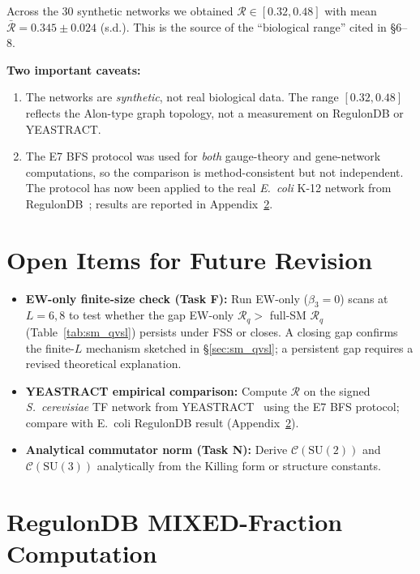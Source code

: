 \documentclass[12pt,a4paper]{article}
\newcommand{\R}{\mathcal{R}}           %
\newcommand{\SU}[1]{\mathrm{SU}(#1)}
\theoremstyle{plain}
\theoremstyle{definition}
\theoremstyle{remark}
\begin{document}
Across the 30 synthetic networks we obtained $\R\in[0.32,0.48]$ with mean
$\bar{\R}=0.345\pm0.024$ (s.d.).  This is the source of the ``biological range''
cited in §6--8.

\textbf{Two important caveats:}
\begin{enumerate}
  \item The networks are \emph{synthetic}, not real biological data.  The range
    $[0.32,0.48]$ reflects the Alon-type graph topology, not a measurement
    on RegulonDB or YEASTRACT.
  \item The E7 BFS protocol was used for \emph{both} gauge-theory and gene-network
    computations, so the comparison is method-consistent but not independent.
    The protocol has now been applied to the real \textit{E.~coli} K-12 network
    from RegulonDB~\citep{SantosZavaleta2019}; results are reported in Appendix~\ref{app:regulondb}.
\end{enumerate}

\section{Open Items for Future Revision}
\label{app:openitems}

\begin{itemize}
  \item \textbf{EW-only finite-size check (Task F):}
    Run EW-only ($\beta_3=0$) scans at $L=6,8$ to test whether the gap
    EW-only $\R_q >$ full-SM $\R_q$ (Table~\ref{tab:sm_qvsl}) persists
    under FSS or closes.  A closing gap confirms the finite-$L$ mechanism
    sketched in §\ref{sec:sm_qvsl}; a persistent gap requires a revised
    theoretical explanation.
  \item \textbf{YEASTRACT empirical comparison:}
    Compute $\R$ on the signed \textit{S.~cerevisiae} TF network from
    YEASTRACT~\citep{Monteiro2020} using the E7 BFS protocol;
    compare with E.~coli RegulonDB result (Appendix~\ref{app:regulondb}).
  \item \textbf{Analytical commutator norm (Task N):}
    Derive $\mathcal{C}(\SU{2})$ and $\mathcal{C}(\SU{3})$ analytically
    from the Killing form or structure constants.
\end{itemize}

\section{RegulonDB MIXED-Fraction Computation}
\label{app:regulondb}
\end{document}
